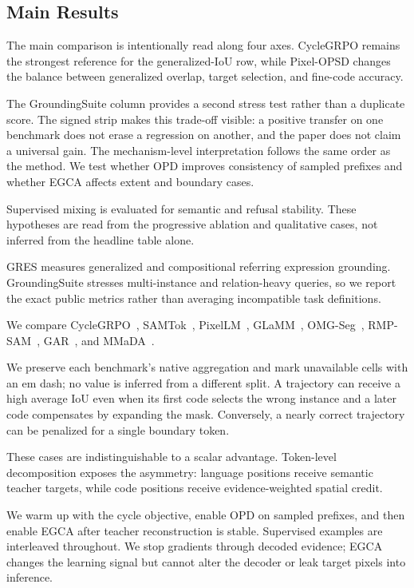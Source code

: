 \documentclass{article}
\begin{document}
\subsection{Main Results}The main comparison is intentionally read along four axes. CycleGRPO remains the strongest reference for the generalized-IoU row, while Pixel-OPSD changes the balance between generalized overlap, target selection, and fine-code accuracy.

The GroundingSuite column provides a second stress test rather than a duplicate score. The signed strip makes this trade-off visible: a positive transfer on one benchmark does not erase a regression on another, and the paper does not claim a universal gain.
The mechanism-level interpretation follows the same order as the method. We test whether OPD improves consistency of sampled prefixes and whether EGCA affects extent and boundary cases.

Supervised mixing is evaluated for semantic and refusal stability. These hypotheses are read from the progressive ablation and qualitative cases, not inferred from the headline table alone.

GRES measures generalized and compositional referring expression grounding. GroundingSuite stresses multi-instance and relation-heavy queries, so we report the exact public metrics rather than averaging incompatible task definitions.

We compare CycleGRPO~\citep{zhang2026cyclegrpo}, SAMTok~\citep{zhou2026samtok}, PixelLM~\citep{li2024pixellm}, GLaMM~\citep{rasheed2024glamm}, OMG-Seg~\citep{li2024omgseg}, RMP-SAM~\citep{li2025rmpsam}, GAR~\citep{wang2026gar}, and MMaDA~\citep{tian2026mmada}.

We preserve each benchmark's native aggregation and mark unavailable cells with an em dash; no value is inferred from a different split.
A trajectory can receive a high average IoU even when its first code selects the wrong instance and a later code compensates by expanding the mask. Conversely, a nearly correct trajectory can be penalized for a single boundary token.

These cases are indistinguishable to a scalar advantage. Token-level decomposition exposes the asymmetry: language positions receive semantic teacher targets, while code positions receive evidence-weighted spatial credit.

We warm up with the cycle objective, enable OPD on sampled prefixes, and then enable EGCA after teacher reconstruction is stable. Supervised examples are interleaved throughout. We stop gradients through decoded evidence; EGCA changes the learning signal but cannot alter the decoder or leak target pixels into inference.
\end{document}
